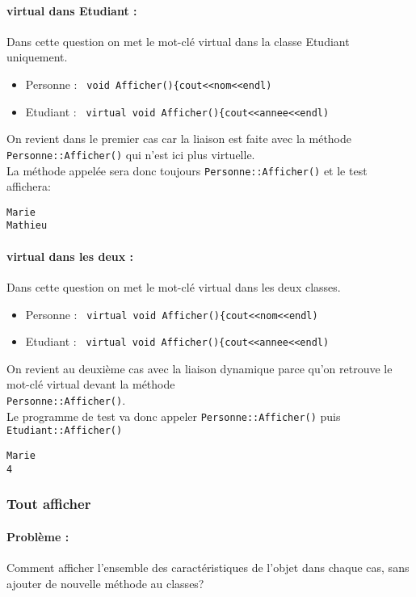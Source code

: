 \documentclass[10pt,a4paper,twoside]{article}
\begin{document}
\paragraph{virtual dans Etudiant :} Dans cette question on met le mot-clé virtual dans la classe Etudiant uniquement.
\begin{itemize}
\item Personne : \verb= void Afficher(){cout<<nom<<endl)=
\item Etudiant : \verb= virtual void Afficher(){cout<<annee<<endl)=
\end{itemize}
On revient dans le premier cas car la liaison est faite avec la méthode\\
 \verb=Personne::Afficher()= qui n'est ici plus virtuelle.\\
La méthode appelée sera donc toujours \verb=Personne::Afficher()= et le test affichera:
\begin{verbatim}
Marie
Mathieu
\end{verbatim}

\paragraph{virtual dans les deux :}Dans cette question on met le mot-clé virtual dans les deux classes.
\begin{itemize}
\item Personne : \verb= virtual void Afficher(){cout<<nom<<endl)=
\item Etudiant : \verb= virtual void Afficher(){cout<<annee<<endl)=
\end{itemize}
On revient au deuxième cas avec la liaison dynamique parce qu'on retrouve le mot-clé virtual devant la méthode \\ \verb=Personne::Afficher()=.\\
Le programme de test va donc appeler \verb=Personne::Afficher()= puis\\
 \verb=Etudiant::Afficher()=
\begin{verbatim}
Marie
4
\end{verbatim}

\subsubsection{Tout afficher}
\paragraph{Problème :} Comment afficher l'ensemble des caractéristiques de l'objet dans chaque cas, sans ajouter de nouvelle méthode au classes?
\end{document}
